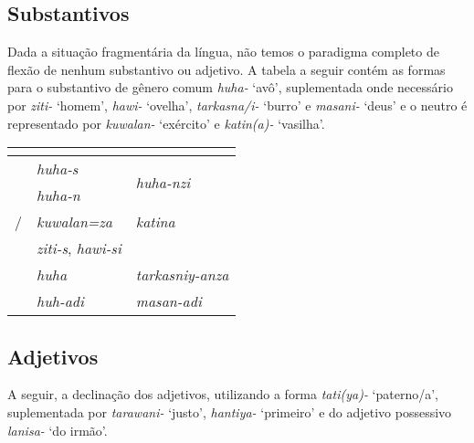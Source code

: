 \subsection{Substantivos}

Dada a situação fragmentária da língua, não temos o paradigma
completo de flexão de nenhum substantivo ou adjetivo. A tabela a seguir contém
as formas para o substantivo de gênero comum \emph{huha-} `avô', suplementada
onde necessário por \emph{ziti-} `homem', \emph{hawi-} `ovelha', \emph{tarkasna\slash{}i-}
`burro' e \emph{masani-} `deus' e o neutro é representado por \emph{kuwalan-}
`exército' e \emph{katin{(a)}-} `vasilha'.


\begin{center}
	\begin{tabular}[c]{lll}
		\toprule
		                      & \Sg{}\emph{}                  & \Pl{}\emph{}                       \\
		\midrule
		\Nom{} \Com{}         & \emph{huha-s}                 & \multirow{2}{4em}{\emph{huha-nzi}} \\
		\Acu{} \Com{}         & \emph{huha-n}                 &                                    \\
		\Nom{}/\Acu{} \Neut{} & \emph{kuwalan=za}             & \emph{katina}                      \\
		\Gen{}                & \emph{ziti-s}, \emph{hawi-si} &                                    \\
		\Dat{}                & \emph{huha}                   & \emph{tarkasniy-anza}              \\
		\Abl{}                & \emph{huh-adi}                & \emph{masan-adi}                   \\
		\bottomrule
	\end{tabular}
\end{center}


\subsection{Adjetivos}
A seguir, a declinação dos adjetivos, utilizando a forma \emph{tati{(ya)}-}
`paterno\slash{}a', suplementada por \emph{tarawani-} `justo',
\emph{hanti{ya}-} `primeiro' e do adjetivo possessivo \emph{lanisa-} `do irmão'.

